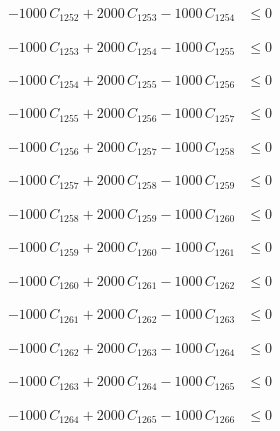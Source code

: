 \documentclass[a4paper,11pt]{article}
\begin{document}
\begin{align}
-1000\,C_{1252} + 2000\,C_{1253} - 1000\,C_{1254} &\leq 0 \nonumber
\end{align}

\begin{align}
-1000\,C_{1253} + 2000\,C_{1254} - 1000\,C_{1255} &\leq 0 \nonumber
\end{align}

\begin{align}
-1000\,C_{1254} + 2000\,C_{1255} - 1000\,C_{1256} &\leq 0 \nonumber
\end{align}

\begin{align}
-1000\,C_{1255} + 2000\,C_{1256} - 1000\,C_{1257} &\leq 0 \nonumber
\end{align}

\begin{align}
-1000\,C_{1256} + 2000\,C_{1257} - 1000\,C_{1258} &\leq 0 \nonumber
\end{align}

\begin{align}
-1000\,C_{1257} + 2000\,C_{1258} - 1000\,C_{1259} &\leq 0 \nonumber
\end{align}

\begin{align}
-1000\,C_{1258} + 2000\,C_{1259} - 1000\,C_{1260} &\leq 0 \nonumber
\end{align}

\begin{align}
-1000\,C_{1259} + 2000\,C_{1260} - 1000\,C_{1261} &\leq 0 \nonumber
\end{align}

\begin{align}
-1000\,C_{1260} + 2000\,C_{1261} - 1000\,C_{1262} &\leq 0 \nonumber
\end{align}

\begin{align}
-1000\,C_{1261} + 2000\,C_{1262} - 1000\,C_{1263} &\leq 0 \nonumber
\end{align}

\begin{align}
-1000\,C_{1262} + 2000\,C_{1263} - 1000\,C_{1264} &\leq 0 \nonumber
\end{align}

\begin{align}
-1000\,C_{1263} + 2000\,C_{1264} - 1000\,C_{1265} &\leq 0 \nonumber
\end{align}

\begin{align}
-1000\,C_{1264} + 2000\,C_{1265} - 1000\,C_{1266} &\leq 0 \nonumber
\end{align}
\end{document}
